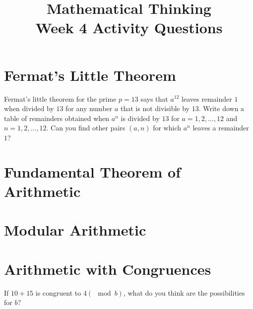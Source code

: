 \documentclass[12pt]{exam}
\title{Mathematical Thinking\\Week 4 Activity Questions}
\begin{document}
\maketitle
\tableofcontents
\section{Fermat's Little Theorem}
\begin{questions}
\question Fermat's little theorem for the prime $p=13$ says that $a^12$ leaves remainder $1$ when divided by $13$ for any number $a$ that is not divisible by $13$. Write down a table of remainders obtained when $a^n$ is divided by $13$ for $a=1, 2,\ldots, 12$ and $n=1, 2, \ldots, 12$. Can you find other pairs $(a,n)$ for which $a^n$ leaves a remainder $1$?
\end{questions}
\section{Fundamental Theorem of Arithmetic}
\section{Modular Arithmetic}

\section{Arithmetic with Congruences}
\begin{questions}
    \question If $10 + 15$ is congruent to $4 (\mod b)$, what do you think are the possibilities for $b$?
\end{questions}
\end{document}
